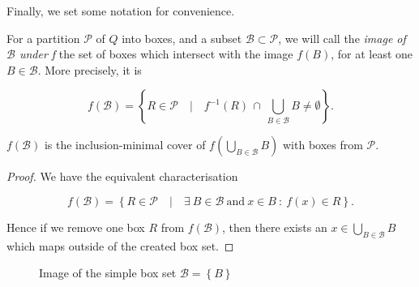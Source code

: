 Finally, we set some notation for convenience.

\begin{definition}
    For a partition $\mathcal{P}$ of $Q$ into boxes, and a subset 
    $\mathcal{B} \subset \mathcal{P}$, we will call the \emph{image of $\mathcal{B}$ under f} 
    the set of boxes which intersect with the image $f(B)$, for at least one 
    $B \in \mathcal{B}$. More precisely, it is 
    
    \begin{equation}
        f (\mathcal{B}) = \left\{
            R \in \mathcal{P} \quad \vert \quad 
            f^{-1} (R)\, \cap\, \bigcup\limits_{B \in \mathcal{B}} B \neq \emptyset
        \right\}.
    \end{equation}

\end{definition}

\begin{theorem}
    $f(\mathcal{B})$ is the inclusion-minimal cover of $f(\bigcup_{B \in \mathcal{B}} B)$
    with boxes from $\mathcal{P}$.
\end{theorem}

\begin{proof}
    We have the equivalent characterisation

    \begin{equation}
        f(\mathcal{B}) = \left\{
            R \in \mathcal{P} \quad \vert \quad
            \exists\ B \in \mathcal{B}\ \text{and}\ x \in B\ :\ f(x) \in R
        \right\}.
    \end{equation}

    Hence if we remove one box $R$ from $f(\mathcal{B})$, then there exists an 
    $x \in \bigcup_{B \in \mathcal{B}} B$ which maps outside of the created box set.

\end{proof}

\begin{figure}[ht]
    \caption{Image of the simple box set $\mathcal{B} = \left\{ B \right\}$}
    \label{fig:boximage}
\end{figure}